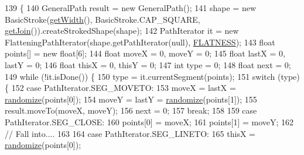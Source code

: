 \begin{DoxyCode}
139                                                       \{
140             GeneralPath result = \textcolor{keyword}{new} GeneralPath();
141             shape = \textcolor{keyword}{new} BasicStroke(\mbox{\hyperlink{classorg_1_1newdawn_1_1slick_1_1font_1_1effects_1_1_outline_effect_a4e38d6349e329f70056eaed9dece69a3}{getWidth}}(), BasicStroke.CAP\_SQUARE, 
      \mbox{\hyperlink{classorg_1_1newdawn_1_1slick_1_1font_1_1effects_1_1_outline_effect_a495949cd03000b18b0d3907596afeb53}{getJoin}}()).createStrokedShape(shape);
142             PathIterator it = \textcolor{keyword}{new} FlatteningPathIterator(shape.getPathIterator(null), 
      \mbox{\hyperlink{classorg_1_1newdawn_1_1slick_1_1font_1_1effects_1_1_outline_wobble_effect_1_1_wobble_stroke_abb70d0bc0ea08d8be8f328ce24eaf8e5}{FLATNESS}});
143             \textcolor{keywordtype}{float} points[] = \textcolor{keyword}{new} \textcolor{keywordtype}{float}[6];
144             \textcolor{keywordtype}{float} moveX = 0, moveY = 0;
145             \textcolor{keywordtype}{float} lastX = 0, lastY = 0;
146             \textcolor{keywordtype}{float} thisX = 0, thisY = 0;
147             \textcolor{keywordtype}{int} type = 0;
148             \textcolor{keywordtype}{float} next = 0;
149             \textcolor{keywordflow}{while} (!it.isDone()) \{
150                 type = it.currentSegment(points);
151                 \textcolor{keywordflow}{switch} (type) \{
152                 \textcolor{keywordflow}{case} PathIterator.SEG\_MOVETO:
153                     moveX = lastX = \mbox{\hyperlink{classorg_1_1newdawn_1_1slick_1_1font_1_1effects_1_1_outline_wobble_effect_1_1_wobble_stroke_a6aa4ed3188495bd4abcf9b2862615330}{randomize}}(points[0]);
154                     moveY = lastY = \mbox{\hyperlink{classorg_1_1newdawn_1_1slick_1_1font_1_1effects_1_1_outline_wobble_effect_1_1_wobble_stroke_a6aa4ed3188495bd4abcf9b2862615330}{randomize}}(points[1]);
155                     result.moveTo(moveX, moveY);
156                     next = 0;
157                     \textcolor{keywordflow}{break};
158 
159                 \textcolor{keywordflow}{case} PathIterator.SEG\_CLOSE:
160                     points[0] = moveX;
161                     points[1] = moveY;
162                     \textcolor{comment}{// Fall into....}
163 
164                 \textcolor{keywordflow}{case} PathIterator.SEG\_LINETO:
165                     thisX = \mbox{\hyperlink{classorg_1_1newdawn_1_1slick_1_1font_1_1effects_1_1_outline_wobble_effect_1_1_wobble_stroke_a6aa4ed3188495bd4abcf9b2862615330}{randomize}}(points[0]);

\end{DoxyCode}
